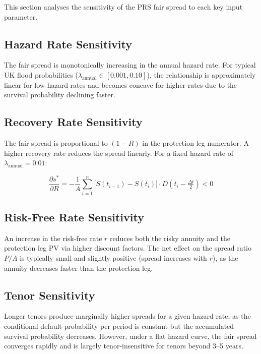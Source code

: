 \documentclass[11pt,a4paper]{article}
\begin{document}
This section analyses the sensitivity of the PRS fair spread to each key input
parameter.

\subsection{Hazard Rate Sensitivity}

The fair spread is monotonically increasing in the annual hazard rate. For typical UK
flood probabilities ($\lambda_{\text{annual}} \in [0.001, 0.10]$), the relationship is
approximately linear for low hazard rates and becomes concave for higher rates due to
the survival probability declining faster.



\subsection{Recovery Rate Sensitivity}

The fair spread is proportional to $(1-R)$ in the protection leg numerator. A higher
recovery rate reduces the spread linearly. For a fixed hazard rate of
$\lambda_{\text{annual}} = 0.01$:

\begin{equation}
    \frac{\partial s^*}{\partial R} = -\frac{1}{A} \sum_{i=1}^{n} \big[S(t_{i-1}) - S(t_i)\big] \cdot D\!\left(t_i - \tfrac{\Delta t}{2}\right) < 0
\end{equation}

\subsection{Risk-Free Rate Sensitivity}

An increase in the risk-free rate $r$ reduces both the risky annuity and the protection
leg PV via higher discount factors. The net effect on the spread ratio $P/A$ is
typically small and slightly positive (spread increases with $r$), as the annuity
decreases faster than the protection leg.

\subsection{Tenor Sensitivity}

Longer tenors produce marginally higher spreads for a given hazard rate, as the
conditional default probability per period is constant but the accumulated survival
probability decreases. However, under a flat hazard curve, the fair spread converges
rapidly and is largely tenor-insensitive for tenors beyond 3--5 years.
\end{document}

